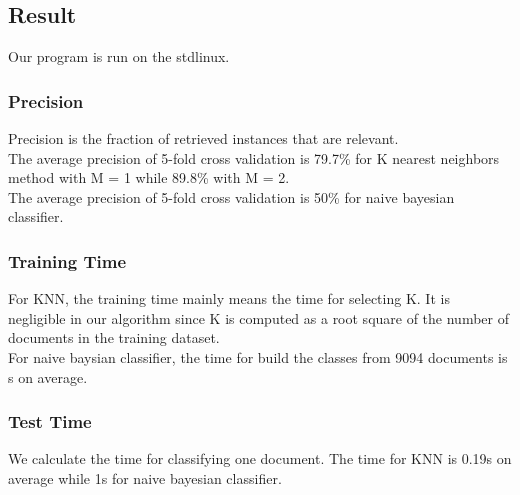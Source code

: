 \documentclass{article}
\begin{document}
\subsection{Result}
Our program is run on the stdlinux.
\subsubsection{Precision}
Precision is the fraction of retrieved instances that are relevant.\\
The average precision of 5-fold cross validation is 79.7\% for K nearest neighbors method with M = 1 while 89.8\% with M = 2.\\
The average precision of 5-fold cross validation is 50\% for naive bayesian classifier. 
\subsubsection{Training Time}
For KNN, the training time mainly means the time for selecting K. It is negligible in our algorithm since K is computed as a root square of the number of documents in the training dataset.\\
For naive baysian classifier, the time for build the classes from 9094 documents is s on average.
\subsubsection{Test Time}
We calculate the time for classifying one document. The time for KNN is 0.19s on average while 1s for naive bayesian classifier.
\end{document}
